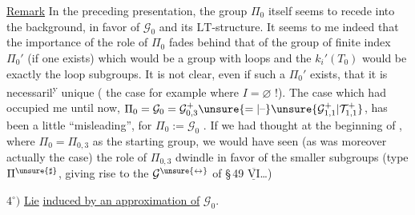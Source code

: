 \uline{Remark} In the preceding presentation, the group $\Pi_0$  itself seems to recede into the background, in favor of $\mathcal{G}_0$  and its $\mathrm{LT}$-structure. It seems to me indeed that the importance of the role of $\Pi_0$ fades behind that of the group  of finite index $\Pi_0'$ (if one exists) which would be  a group with loops and  the $k_i'(T_0)$  would be  exactly the loop subgroups. It is not  clear, even if such a $\Pi_0'$ exists, that it is necessaril\textsuperscript{y} unique ( the case for example where $I=\varnothing$ !). The case which had occupied me until now, $\Pi_0=\mathcal{G}_0=\mathcal{G}_{0,3}^{+}\unsure{=|\text{--}}\unsure{\mathcal{G}_{1,1}^{+}|\mathcal{T}_{1,1}^{+}}$, has been a little ``misleading'', for  $\Pi_0:=\mathcal{G}_0$  . If we had thought    at the beginning of , where  $\Pi_0=\Pi_{0,3}$ as the starting group, we would have seen (as was moreover actually the case) the role of $\Pi_{0,3}$ dwindle in favor of the smaller subgroups (type $\Pi^{\unsure{\sharp}}$, giving rise to the $\mathcal{G}^{\unsure{\leftrightarrow}}$ of \S\,49 $\overline{\underline{\mathrm{VI}}}$\ldots)

$4^\circ)$ \uline{Lie}   \uline{induced by an approximation of} $\mathcal{G}_0$.

